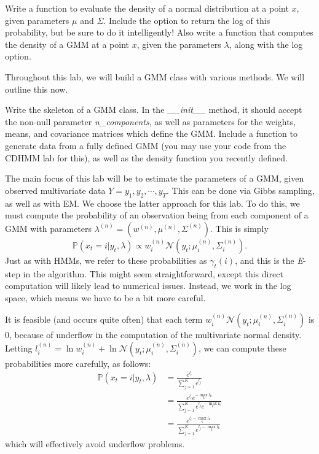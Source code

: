 \begin{problem}
Write a function to evaluate the density of a normal distribution at a point $x$, given parameters $\mu$ and $\Sigma$. Include the option to return the log of this probability, but be sure to do it intelligently! Also write a function that computes the density of a GMM at a point $x$, given the parameters $\lambda$, along with the log option.
\end{problem}

Throughout this lab, we will build a GMM class with various methods. We will outline this now.

\begin{problem}
Write the skeleton of a GMM class. In the \emph{\_\_init\_\_} method, it should accept the non-null parameter \emph{n\_components}, as well as parameters for the weights, means, and covariance matrices which define the GMM. Include a function to generate data from a fully defined GMM (you may use your code from the CDHMM lab for this), as well as the density function you recently defined.
\end{problem}

The main focus of this lab will be to estimate the parameters of a GMM, given observed multivariate data $Y = y_{1}, y_{2}, \cdots, y_{T}$. This can be done via Gibbs sampling, as well as with EM. We choose the latter approach for this lab. To do this, we must compute the probability of an observation being from each component of a GMM with parameters $\lambda^{(n)} = \left( w^{(n)}, \mu^{(n)}, \Sigma^{(n)}\right)$. This is simply $$\mathbb{P}(x_{t} = i | y_{t}, \lambda) \propto w_{i}^{(n)} \mathcal{N}(y_{t} ; \mu_{i}^{(n)}, \Sigma_{i}^{(n)}).$$
Just as with HMMs, we refer to these probabilities as $\gamma_{t}(i)$, and this is the \emph{E}-step in the algorithm. This might seem straightforward, except this direct computation will likely lead to numerical issues. Instead, we work in the log space, which means we have to be a bit more careful.

It is feasible (and occurs quite often) that each term $w_{i}^{(n)}\mathcal{N}(y_{t} ; \mu_{i}^{(n)}, \Sigma_{i}^{(n)})$ is $0$, because of underflow in the computation of the multivariate normal density. Letting $l_{i}^{(n)} = \ln w_{i}^{(n)} + \ln \mathcal{N}(y_{t} ; \mu_{i}^{(n)}, \Sigma_{i}^{(n)})$, we can compute these probabilities more carefully, as follows:
\begin{align*}
\mathbb{P}(x_{t} = i | y_{t}, \lambda) & = \frac{e^{l_{i}}}{\sum_{j=1}^{K} e^{l_{j}}} \\
& = \frac{e^{l_{i}}e^{-\max_{k} l_{k}}}{\sum_{j=1}^{K} e^{l_{j}}e^{-\max_{k} l_{k}}} \\
& = \frac{e^{l_{i} - \max_{k} l_{k}}}{\sum_{j=1}^{K} e^{l_{j} - \max_{k} l_{k}}}
\end{align*}
which will effectively avoid underflow problems.

